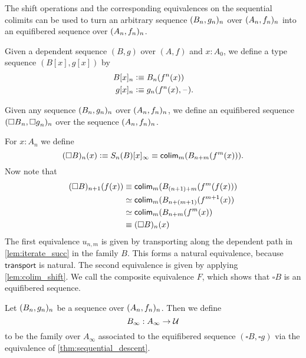 The shift operations and the corresponding equivalences on the sequential colimits can be used to turn an arbitrary sequence $({B}_{n},{g}_{n})_{n}$ over $({A}_{n},{f}_{n})_{n}$ into an equifibered sequence over $({A}_{n},{f}_{n})_{n}$. 

\begin{defn}
Given a dependent sequence $(B,g)$ over $(A,f)$ and $x:A_0$, we define a type sequence $(B[x],g[x])$ by
\begin{align*}
B[x]_n & \vcentcolon\equiv B_n(f^n(x)) \\
g[x]_n & \vcentcolon\equiv g_n(f^n(x),\mathord{\hspace{1pt}\text{--}\hspace{1pt}}).
\end{align*}
\end{defn}

\begin{defn}
Given any sequence $({B}_{n},{g}_{n})_{n}$ over $({A}_{n},{f}_{n})_{n}$, we define an equifibered sequence
$({\square B}_{n},{\square g}_{n})_{n}$ over the sequence $({A}_{n},{f}_{n})_{n}$.
\end{defn}

\begin{constr}
For $x:A_n$ we define
\begin{equation*}
(\square B)_n(x) \vcentcolon\equiv S_n(B)[x]_{\infty} \equiv \mathsf{colim}_m(B_{n+m}(f^m(x))).
\end{equation*}
Now note that
\begin{align*}
  (\square B)_{n+1}(f(x)) & \equiv \mathsf{colim}_m(B_{(n+1)+m}(f^m(f(x))) \\
  & \simeq \mathsf{colim}_m(B_{n+(m+1)}(f^{m+1}(x))\\
  & \simeq \mathsf{colim}_m(B_{n+m}(f^m(x))\\
  & \equiv (\square B)_n(x)
\end{align*}
The first equivalence $u_{n,m}$ is given by transporting along the dependent path in \autoref{lem:iterate_succ} in the family $B$. This forms a natural equivalence, because $\mathsf{transport}$ is natural. The second equivalence is given by applying \autoref{lem:colim_shift}. We call the composite equivalence $F$, which shows that $\square B$ is an equifibered sequence.
\end{constr}

\begin{defn}
Let $({B}_{n},{g}_{n})_{n}$ be a sequence over $({A}_{n},{f}_{n})_{n}$. Then we define
\begin{equation*}
B_\infty : A_\infty\to\mathcal{U}
\end{equation*}
to be the family over $A_\infty$ associated to the equifibered sequence $(\square B,\square g)$ via the equivalence of \autoref{thm:sequential_descent}.
\end{defn}

